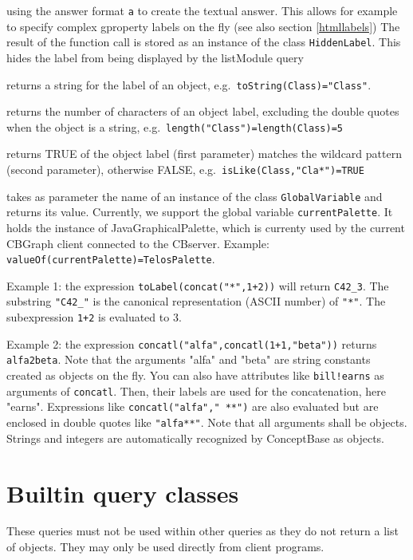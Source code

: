 \begin{description}
   using the answer format {\tt a} to create the textual answer. This allows for example to specify complex gproperty labels on the fly (see also section \ref{htmllabels})
   The result of the function call is stored as an instance of the class {\tt HiddenLabel}. This hides the label from
   being displayed by the listModule query
\item[toString:] returns a string for the label of an object, e.g.\ {\tt toString(Class)="Class"}.
\item[length:] returns the number of characters of an object label, excluding the double quotes when the object is
   a string, e.g.\ {\tt length("Class")=length(Class)=5}
\item[isLike:] returns TRUE of the object label (first parameter) matches the wildcard
   pattern (second parameter), otherwise FALSE,
   e.g.\ {\tt isLike(Class,"Cla*")=TRUE}
\item[valueOf:] takes as parameter the name of an instance of the class {\tt GlobalVariable} and returns its value. Currently, we support
  the global variable {\tt currentPalette}. It holds the instance of JavaGraphicalPalette, which is currenty used 
  by the current CBGraph client connected to the CBserver. Example: {\tt valueOf(currentPalette)=TelosPalette}.

\end{description}

Example 1: the expression {\tt toLabel(concat("*",1+2))} will return
{\tt C42\_3}. The substring {\tt "C42\_"} is the canonical representation (ASCII number)
of {\tt "*"}. The subexpression {\tt 1+2}  is evaluated to 3.

Example 2: the expression {\tt concatl("alfa",concatl(1+1,"beta"))} returns {\tt alfa2beta}.
Note that the arguments "alfa" and "beta" are string constants created as objects on the fly.
You can also have attributes like {\tt bill!earns}  as arguments of {\tt concatl}. Then, their labels are used
for the concatenation, here "earns". Expressions like {\tt concatl("alfa"," **")} are also evaluated
but are enclosed in double quotes like {\tt "alfa**"}. Note that all arguments shall be objects.
Strings and integers are automatically recognized by ConceptBase as objects.


\section{Builtin query classes}

These queries must not be used within other queries as they do not return
a list of objects. They may only be used directly from client programs.

